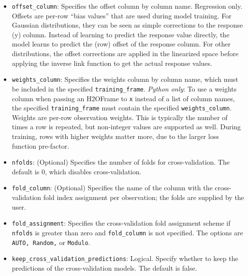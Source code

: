 {{\begin{itemize}
\item \texttt{offset\_column}:  Specifies the offset column by column name.  Regression only.  Offsets are per-row ``bias values'' that are used during model training. For Gaussian distributions, they can be seen as simple corrections to the response (y) column. Instead of learning to predict the response value directly, the model learns to predict the (row) offset of the response column. For other distributions, the offset corrections are applied in the linearized space before applying the inverse link function to get the actual response values. 

\item \texttt{weights\_column}: Specifies the weights column by column name, which must be included in the specified \texttt{training\_frame}. \textit{Python only}: To use a weights column when passing an H2OFrame to \texttt{x} instead of a list of column names, the specified \texttt{training\_frame} must contain the specified \texttt{weights\_column}. Weights are per-row observation weights. This is typically the number of times a row is repeated, but non-integer values are supported as well. During training, rows with higher weights matter more, due to the larger loss function pre-factor.

\item \texttt{nfolds}: (Optional) Specifies the number of folds for cross-validation. %
The default is 0, which disables cross-validation.

\item \texttt{fold\_column}: (Optional) Specifies the name of the column with the cross-validation fold index assignment per observation; the folds are supplied by the user. 

\item \texttt{fold\_assignment}: Specifies the cross-validation fold assignment scheme if \texttt{nfolds} is greater than zero and \texttt{fold\_column} is not specified. The options are \texttt{AUTO, Random,} or \texttt{Modulo}. 

\item \texttt{keep\_cross\_validation\_predictions}: Logical.  Specify whether to keep the predictions of the cross-validation models.  The default is false.

\end{itemize}

}}

